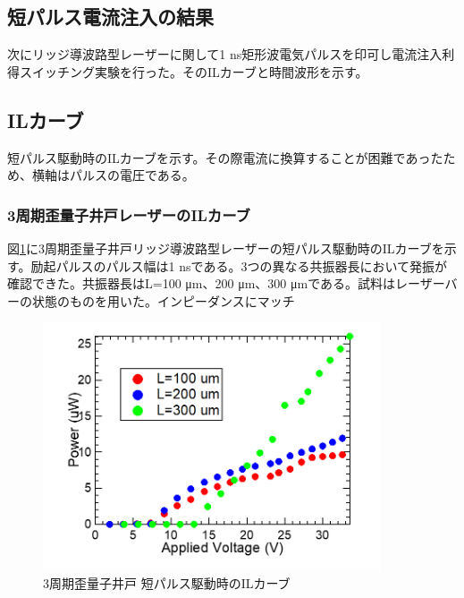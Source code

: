 {\clearpage
\subsection{短パルス電流注入の結果}

次にリッジ導波路型レーザーに関して1 ns矩形波電気パルスを印可し電流注入利得スイッチング実験を行った。そのILカーブと時間波形を示す。
\subsection{ILカーブ}
短パルス駆動時のILカーブを示す。その際電流に換算することが困難であったため、横軸はパルスの電圧である。
\subsubsection{3周期歪量子井戸レーザーのILカーブ}
図\ref{fig:fig_3_2_3QW_ridge_GS_power}に3周期歪量子井戸リッジ導波路型レーザーの短パルス駆動時のILカーブを示す。励起パルスのパルス幅は1 nsである。3つの異なる共振器長において発振が確認できた。共振器長はL=100 \si{\micro\metre}、200 \si{\micro\metre}、300 \si{\micro\metre}である。試料はレーザーバーの状態のものを用いた。インピーダンスにマッチ

\begin{figure}[h]
	\centering
	\includegraphics[width=10cm]{figure/fig_3_2_3QW_ridge_GS_power.png}
		\caption{3周期歪量子井戸 短パルス駆動時のILカーブ}
		\label{fig:fig_3_2_3QW_ridge_GS_power}
\end{figure}


}
